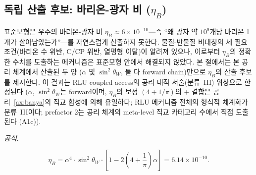 \documentclass[entropy,article,submit,pdftex,oneauthor]{Definitions/mdpi}
\begin{document}
\subsection{독립 산출 후보: 바리온-광자 비 ($\eta_B$)}
\label{sec:baryogenesis}

표준모형은 우주의 바리온-광자 비 $\eta_B \approx 6 \times 10^{-10}$---즉 ``왜 광자 약 $10^9$개당 바리온 1개가 살아남았는가''---를 자연스럽게 산출하지 못한다. 물질-반물질 비대칭의 세 필요 조건(바리온 수 위반, C/CP 위반, 열평형 이탈)이 알려져 있으나, 이로부터 $\eta_B$의 정확한 수치를 도출하는 메커니즘은 표준모형 안에서 해결되지 않았다. 본 절에서는 본 공리 체계에서 산출된 두 양 ($\alpha$ 및 $\sin^2\theta_W$, 둘 다 forward chain)만으로 $\eta_B$의 산출 후보를 제시한다. 이 결과는 RLU coupled access의 공리 내적 서술(분류~III) 위상으로 한정된다 ($\alpha$, $\sin^2\theta_W$는 forward이며, $\eta_B$의 보정 $(4+1/\pi)$의 $+$ 결합은 공리~\ref{ax:banya}의 직교 합성에 의해 유일하다; RLU 메커니즘 전체의 형식적 체계화가 분류~III이다; prefactor 2는 공리 체계의 meta-level 직교 카테고리 수에서 직접 도출된다 (A1c)).

\emph{공식}.
\begin{linenomath}
\begin{equation}
\eta_B = \alpha^4 \cdot \sin^2\theta_W \cdot \left[ 1 - 2\!\left(4 + \frac{1}{\pi}\right)\alpha \right] = 6.14 \times 10^{-10}.
\label{eq:eta-B}
\end{equation}
\end{linenomath}
\end{document}
